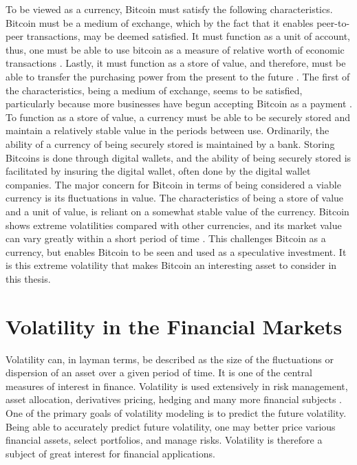 To be viewed as a currency, Bitcoin must satisfy the following characteristics.
Bitcoin must be a medium of exchange, which by the fact that it enables peer-to-peer transactions, may be deemed satisfied.
It must function as a unit of account, thus, one must be able to use bitcoin as a measure of relative worth of economic transactions \cite[p. 80-81]{mankiwMacroeconomics2009}.
Lastly, it must function as a store of value, and therefore, must be able to transfer the purchasing power from the present to the future \cite[p. 80-81]{mankiwMacroeconomics2009}.
The first of the characteristics, being a medium of exchange, seems to be satisfied, particularly because more businesses have begun accepting Bitcoin as a payment \cite[p. 36-38]{YERMACK201531}.
To function as a store of value, a currency must be able to be securely stored and maintain a relatively stable value in the periods between use.
Ordinarily, the ability of a currency of being securely stored is maintained by a bank.
Storing Bitcoins is done through digital wallets, and the ability of being securely stored is facilitated by insuring the digital wallet, often done by the digital wallet companies.
The major concern for Bitcoin in terms of being considered a viable currency is its fluctuations in value.
The characteristics of being a store of value and a unit of value, is reliant on a somewhat stable value of the currency.
Bitcoin shows extreme volatilities compared with other currencies, and its market value can vary greatly within a short period of time \cite[p. 38-43]{YERMACK201531}.
This challenges Bitcoin as a currency, but enables Bitcoin to be seen and used as a speculative investment.
It is this extreme volatility that makes Bitcoin an interesting asset to consider in this thesis.

\section{Volatility in the Financial Markets}
\label{sec:org0l6r8i7}
Volatility can, in layman terms, be described as the size of the fluctuations or dispersion of an asset over a given period of time.
It is one of the central measures of interest in finance.
Volatility is used extensively in risk management, asset allocation, derivatives pricing, hedging and many more financial subjects \cite[p. 237]{engleWhatGoodVolatility}.
One of the primary goals of volatility modeling is to predict the future volatility.
Being able to accurately predict future volatility, one may better price various financial assets, select portfolios, and manage risks.
Volatility is therefore a subject of great interest for financial applications.

